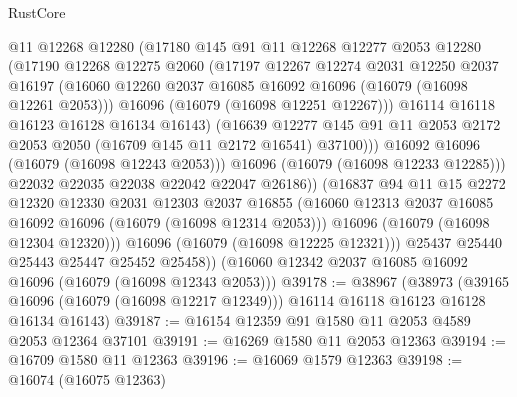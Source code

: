 \begin{lexlean}{RustCore}
\begin{coremodule}
                    @11
                    @12268
                    @12280
                    (@17180
                      @145
                      @91
                      @11
                      @12268
                      @12277
                      @2053
                      @12280
                      (@17190
                        @12268
                        @12275
                        @2060
                        (@17197
                          @12267
                          @12274
                          @2031
                          @12250
                          @2037
                          @16197
                          (@16060 @12260 @2037 @16085 @16092 @16096 (@16079 (@16098 @12261 @2053)))
                          @16096
                          (@16079 (@16098 @12251 @12267)))
                        @16114
                        @16118
                        @16123
                        @16128
                        @16134
                        @16143)
                      (@16639
                        @12277
                        @145
                        @91
                        @11
                        @2053
                        @2172
                        @2053
                        @2050
                        (@16709 @145 @11 @2172 @16541)
                        @37100)))
                  @16092
                  @16096
                  (@16079 (@16098 @12243 @2053)))
                @16096
                (@16079 (@16098 @12233 @12285)))
              @22032
              @22035
              @22038
              @22042
              @22047
              @26186))
          (@16837
            @94
            @11
            @15
            @2272
            @12320
            @12330
            @2031
            @12303
            @2037
            @16855
            (@16060 @12313 @2037 @16085 @16092 @16096 (@16079 (@16098 @12314 @2053)))
            @16096
            (@16079 (@16098 @12304 @12320)))
          @16096
          (@16079 (@16098 @12225 @12321)))
        @25437
        @25440
        @25443
        @25447
        @25452
        @25458))
    (@16060 @12342 @2037 @16085 @16092 @16096 (@16079 (@16098 @12343 @2053)))
@39178 := @38967
    (@38973
      (@39165 @16096 (@16079 (@16098 @12217 @12349)))
      @16114
      @16118
      @16123
      @16128
      @16134
      @16143)
@39187 := @16154 @12359 @91 @1580 @11 @2053 @4589 @2053 @12364 @37101
@39191 := @16269 @1580 @11 @2053 @12363
@39194 := @16709 @1580 @11 @12363
@39196 := @16069 @1579 @12363
@39198 := @16074 (@16075 @12363)

\end{coremodule}
\end{lexlean}
